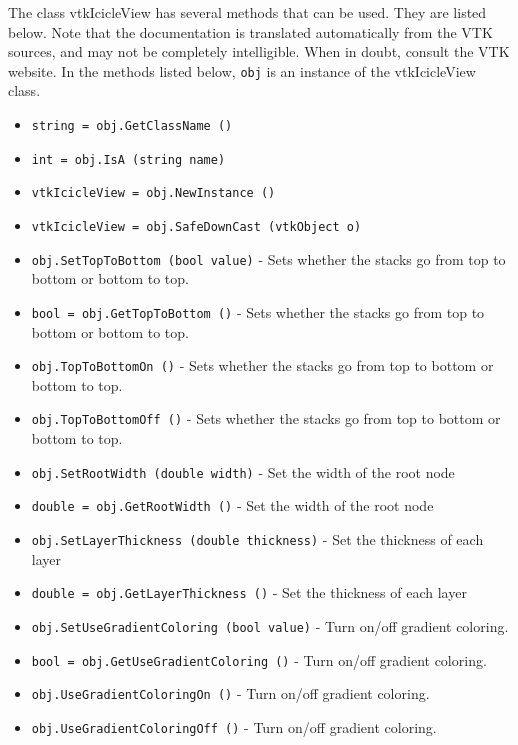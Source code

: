 The class vtkIcicleView has several methods that can be used.
  They are listed below.
Note that the documentation is translated automatically from the VTK sources,
and may not be completely intelligible.  When in doubt, consult the VTK website.
In the methods listed below, \verb|obj| is an instance of the vtkIcicleView class.
\begin{itemize}
\item  \verb|string = obj.GetClassName ()|

\item  \verb|int = obj.IsA (string name)|

\item  \verb|vtkIcicleView = obj.NewInstance ()|

\item  \verb|vtkIcicleView = obj.SafeDownCast (vtkObject o)|

\item  \verb|obj.SetTopToBottom (bool value)| -  Sets whether the stacks go from top to bottom or bottom to top.

\item  \verb|bool = obj.GetTopToBottom ()| -  Sets whether the stacks go from top to bottom or bottom to top.

\item  \verb|obj.TopToBottomOn ()| -  Sets whether the stacks go from top to bottom or bottom to top.

\item  \verb|obj.TopToBottomOff ()| -  Sets whether the stacks go from top to bottom or bottom to top.

\item  \verb|obj.SetRootWidth (double width)| -  Set the width of the root node

\item  \verb|double = obj.GetRootWidth ()| -  Set the width of the root node

\item  \verb|obj.SetLayerThickness (double thickness)| -  Set the thickness of each layer

\item  \verb|double = obj.GetLayerThickness ()| -  Set the thickness of each layer

\item  \verb|obj.SetUseGradientColoring (bool value)| -  Turn on/off gradient coloring.

\item  \verb|bool = obj.GetUseGradientColoring ()| -  Turn on/off gradient coloring.

\item  \verb|obj.UseGradientColoringOn ()| -  Turn on/off gradient coloring.

\item  \verb|obj.UseGradientColoringOff ()| -  Turn on/off gradient coloring.

\end{itemize}

